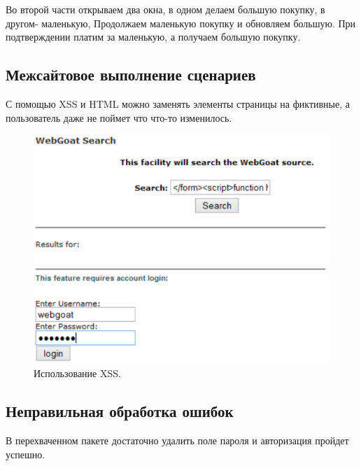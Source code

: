 \documentclass[a4paper, 14pt]{article}				%
\begin{document}
Во второй части открываем два окна, в одном делаем большую покупку, в другом- маленькую, Продолжаем маленькую покупку и обновляем большую. При подтверждении платим за маленькую, а получаем большую покупку.

\subsection{Межсайтовое выполнение сценариев}
С помощью XSS и HTML можно заменять элементы страницы на фиктивные, а пользователь даже не поймет что что-то изменилось.
\begin{figure}[h!]
\centering
\includegraphics[width=\textwidth]{rsrc/7_1}
\caption{Использование XSS.}
\end{figure}

\subsection{Неправильная обработка ошибок}
В перехваченном пакете достаточно удалить поле пароля и авторизация пройдет успешно.
\end{document}
